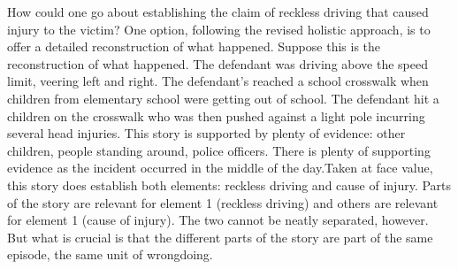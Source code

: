 \documentclass[
  10pt,
  dvipsnames,enabledeprecatedfontcommands]{scrartcl}
\begin{document}
How could one go about establishing the claim of reckless driving that
caused injury to the victim? One option, following the revised holistic
approach, is to offer a detailed reconstruction of what happened.
Suppose this is the reconstruction of what happened. The defendant was
driving above the speed limit, veering left and right. The defendant's
reached a school crosswalk when children from elementary school were
getting out of school. The defendant hit a children on the crosswalk who
was then pushed against a light pole incurring several head injuries.
This story is supported by plenty of evidence: other children, people
standing around, police officers. There is plenty of supporting evidence
as the incident occurred in the middle of the day.Taken at face value,
this story does establish both elements: reckless driving and cause of
injury. Parts of the story are relevant for element 1 (reckless driving)
and others are relevant for element 1 (cause of injury). The two cannot
be neatly separated, however. But what is crucial is that the different
parts of the story are part of the same episode, the same unit of
wrongdoing.
\end{document}
